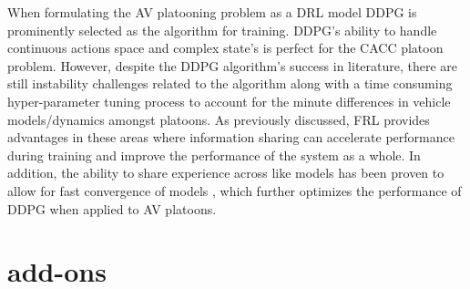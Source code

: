 When formulating the AV platooning problem as a DRL model DDPG is prominently selected
as the algorithm for training.  DDPG's ability to handle continuous actions space and
complex state's is perfect for the CACC platoon problem.  However, despite the DDPG
algorithm's success in literature, there are still instability challenges related to
the algorithm along with a time consuming hyper-parameter tuning process to account
for the minute differences in vehicle models/dynamics amongst platoons. As previously
discussed, FRL provides advantages in these areas where information sharing can accelerate
performance during training and improve the performance of the system as a whole. In
addition, the ability to share experience across like models has been proven to allow
for fast convergence of models \cite{Lim2020}, which further optimizes the performance
of DDPG when applied to AV platoons.

\section{add-ons}


\cite{Schwarting2018}
\cite{Shwartz2018}
\cite{Hussain2019}
\cite{Vinitsky2018}
\cite{Kiran2020}
\cite{Li2019}
\cite{Kendall2019}
\cite{Yuan2019}
\cite{zhangYuxiang2020}
